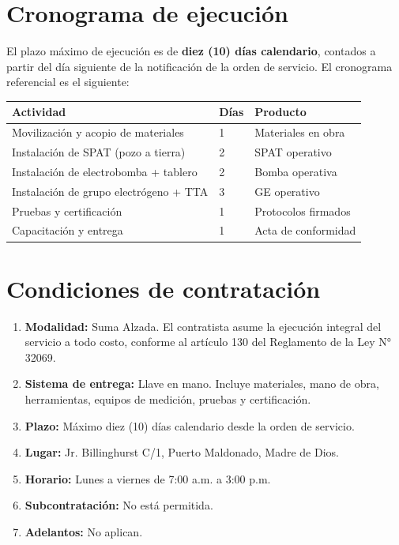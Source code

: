 \documentclass[12pt,a4paper]{article}
\begin{document}
\section{Cronograma de ejecución}

El plazo máximo de ejecución es de \textbf{diez (10) días calendario}, contados a partir del día siguiente de la notificación de la orden de servicio. El cronograma referencial es el siguiente:

\begin{center}
\begin{tabular}{L{4.5cm}L{1.5cm}L{3.5cm}}
\toprule
\textbf{Actividad} & \textbf{Días} & \textbf{Producto} \\
\midrule
Movilización y acopio de materiales & 1 & Materiales en obra \\
Instalación de SPAT (pozo a tierra) & 2 & SPAT operativo \\
Instalación de electrobomba + tablero & 2 & Bomba operativa \\
Instalación de grupo electrógeno + TTA & 3 & GE operativo \\
Pruebas y certificación & 1 & Protocolos firmados \\
Capacitación y entrega & 1 & Acta de conformidad \\
\bottomrule
\end{tabular}
\end{center}

\section{Condiciones de contratación}

\begin{enumerate}[label=\arabic*.]
  \item \textbf{Modalidad:} Suma Alzada. El contratista asume la ejecución integral del servicio a todo costo, conforme al artículo 130 del Reglamento de la Ley N° 32069.
  \item \textbf{Sistema de entrega:} Llave en mano. Incluye materiales, mano de obra, herramientas, equipos de medición, pruebas y certificación.
  \item \textbf{Plazo:} Máximo diez (10) días calendario desde la orden de servicio.
  \item \textbf{Lugar:} Jr. Billinghurst C/1, Puerto Maldonado, Madre de Dios.
  \item \textbf{Horario:} Lunes a viernes de 7:00 a.m. a 3:00 p.m.
  \item \textbf{Subcontratación:} No está permitida.
  \item \textbf{Adelantos:} No aplican.
\end{enumerate}
\end{document}
